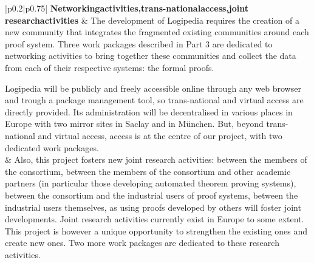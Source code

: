 \begin{longtable*}{|p{0.2\textwidth}|p{0.75\textwidth}|}
{\bf Networking\newline activities,\newline trans-national\newline access,\newline joint research\newline activities}
&
The development of Logipedia requires the creation of a new community that
integrates the fragmented existing communities around each proof system.
Three work packages described in Part 3
are dedicated to networking activities
to bring together these communities and collect the data from each of
their respective systems: the formal proofs.

\hspace{0.4cm}
Logipedia will be publicly and freely accessible online through any
web browser and trough a package management tool, so trans-national
and virtual access are directly provided. Its administration will be
decentralised in various places in Europe with two mirror sites in
Saclay and in M\"unchen. But, beyond trans-national and virtual
access, access is at the centre of our project, with two dedicated
work packages.\\
&
\hspace{0.4cm}
Also, this project fosters new joint research activities:
between the members of the consortium, between the members of
the consortium and other academic partners (in particular those
developing automated theorem proving systems), between the
consortium and the industrial users of proof systems, between
the industrial users themselves, as using proofs developed by others
will foster joint developments.  Joint research activities
currently exist in Europe to some extent.  This project is however a
unique opportunity to strengthen the existing ones and create new
ones. Two more work packages are dedicated
to these research activities.  
\\
\hline


\end{longtable*}
